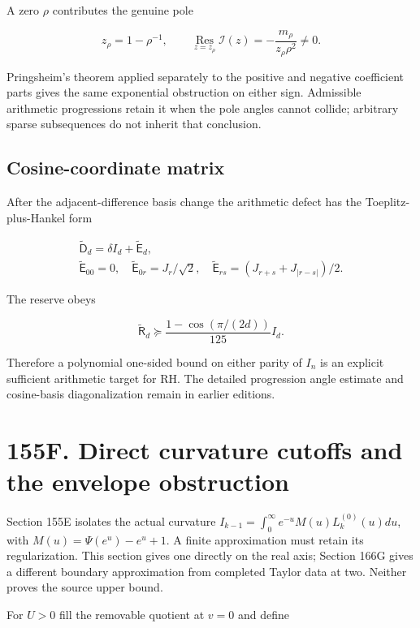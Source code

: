 \documentclass[
  11pt,
]{book}
\begin{document}
A zero \(\rho\) contributes the genuine pole

\[
z_\rho=1-\rho^{-1},\qquad
\operatorname*{Res}_{z=z_\rho}\mathcal I(z)
=-\frac{m_\rho}{z_\rho\rho^2}\ne0.
\tag{155E.5}
\]

Pringsheim's theorem applied separately to the positive and negative
coefficient parts gives the same exponential obstruction on either sign.
Admissible arithmetic progressions retain it when the pole angles cannot
collide; arbitrary sparse subsequences do not inherit that conclusion.

\subsection{Cosine-coordinate matrix}\label{cosine-coordinate-matrix}

After the adjacent-difference basis change the arithmetic defect has the
Toeplitz-plus-Hankel form

\[
\begin{gathered}
\widetilde{\mathsf D}_d=\delta I_d+\widetilde{\mathsf E}_d,\\
\widetilde{\mathsf E}_{00}=0,\quad
\widetilde{\mathsf E}_{0r}=J_r/\sqrt2,\quad
\widetilde{\mathsf E}_{rs}=(J_{r+s}+J_{|r-s|})/2.
\end{gathered}
\tag{155E.14}
\]

The reserve obeys

\[
\widetilde{\mathsf R}_d\succeq
\frac{1-\cos(\pi/(2d))}{125}I_d.
\tag{155E.15}
\]

Therefore a polynomial one-sided bound on either parity of \(I_n\) is an
explicit sufficient arithmetic target for RH. The detailed progression
angle estimate and cosine-basis diagonalization remain in earlier
editions.

\section{155F. Direct curvature cutoffs and the envelope
obstruction}\label{f.-direct-curvature-cutoffs-and-the-envelope-obstruction}

Section 155E isolates the actual curvature \(I_{k-1}=\int_0^\infty
 e^{-u}M(u)L_k^{(0)}(u)du\), with \(M(u)=\Psi(e^u)-e^u+1\). A finite
approximation must retain its regularization. This section gives one
directly on the real axis; Section 166G gives a different boundary
approximation from completed Taylor data at two. Neither proves the
source upper bound.

For \(U>0\) fill the removable quotient at \(v=0\) and define
\end{document}
